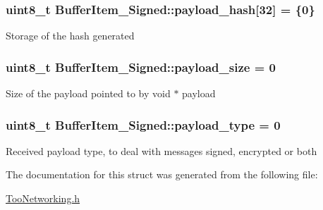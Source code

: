 \subsubsection[{\texorpdfstring{payload\+\_\+hash}{payload_hash}}]{\setlength{\rightskip}{0pt plus 5cm}uint8\+\_\+t Buffer\+Item\+\_\+\+Signed\+::payload\+\_\+hash\mbox{[}32\mbox{]} = \{0\}}\hypertarget{structBufferItem__Signed_aea55c4b9fa78da421de8f83df370fb57}{}\label{structBufferItem__Signed_aea55c4b9fa78da421de8f83df370fb57}
Storage of the hash generated 
\subsubsection[{\texorpdfstring{payload\+\_\+size}{payload_size}}]{\setlength{\rightskip}{0pt plus 5cm}uint8\+\_\+t Buffer\+Item\+\_\+\+Signed\+::payload\+\_\+size = 0}\hypertarget{structBufferItem__Signed_a99af0ec40a5d44a11df8592667fe7614}{}\label{structBufferItem__Signed_a99af0ec40a5d44a11df8592667fe7614}
Size of the payload pointed to by void $\ast$ payload 
\subsubsection[{\texorpdfstring{payload\+\_\+type}{payload_type}}]{\setlength{\rightskip}{0pt plus 5cm}uint8\+\_\+t Buffer\+Item\+\_\+\+Signed\+::payload\+\_\+type = 0}\hypertarget{structBufferItem__Signed_a75a67331ae70b15b59ba8941313e4fce}{}\label{structBufferItem__Signed_a75a67331ae70b15b59ba8941313e4fce}
Received payload type, to deal with messages signed, encrypted or both 

The documentation for this struct was generated from the following file\+:\begin{DoxyCompactItemize}
\item 
\hyperlink{TooNetworking_8h}{Too\+Networking.\+h}\end{DoxyCompactItemize}
